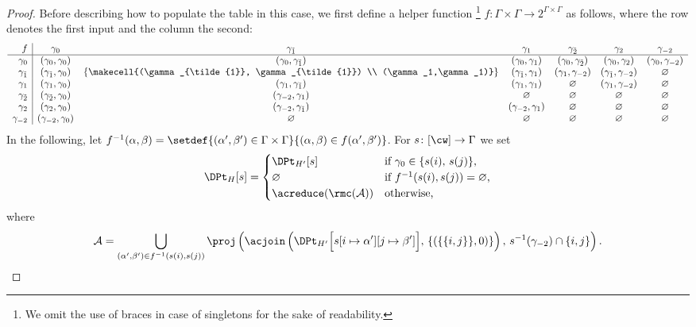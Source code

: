 \begin{proof}
    Before describing how to populate the table in this case,
    we first define a helper function%
    \footnote{We omit the use of braces in case of singletons for the sake of readability.}
    $f \colon \Gamma \times \Gamma \to 2^{\Gamma \times \Gamma}$
    as follows, where the row denotes the first input and the column the second:
    \[
        \begin{array}{r|cccccc}
            f 	                & \gamma_0 							& \gamma_{\tilde{1}} 																			& \gamma_1 							& \gamma_{\tilde{2}} 				& \gamma_2 							& \gamma_{-2} \\
            \hline
            \gamma_0 			& (\gamma_0, \gamma_0) 				& (\gamma_0, \gamma_{\tilde{1}}) 																& (\gamma_0, \gamma_1) 				& (\gamma_0, \gamma_{\tilde{2}}) 	& (\gamma_0, \gamma_2) 				& (\gamma_0, \gamma_{-2}) \\
            \gamma_{\tilde{1}} 	& (\gamma_{\tilde{1}}, \gamma_0) 	& \left\{\makecell{(\gamma_{\tilde{1}}, \gamma_{\tilde{1}}) \\ (\gamma_1,\gamma_1)} \right\} 	& (\gamma_{\tilde{1}}, \gamma_1) 	& (\gamma_1, \gamma_{-2}) 			& (\gamma_{\tilde{1}}, \gamma_{-2}) & \varnothing \\
            \gamma_1 			& (\gamma_1, \gamma_0) 				& (\gamma_1, \gamma_{\tilde{1}}) 																& (\gamma_1, \gamma_1) 				& \varnothing 								& (\gamma_1, \gamma_{-2}) 	& \varnothing \\
            \gamma_{\tilde{2}} 	& (\gamma_{\tilde{2}}, \gamma_0)	& (\gamma_{-2}, \gamma_1) 																		& \varnothing 						& \varnothing 								& \varnothing 				& \varnothing \\
            \gamma_2 			& (\gamma_2, \gamma_0) 				& (\gamma_{-2}, \gamma_{\tilde{1}}) 															& (\gamma_{-2}, \gamma_1) 			& \varnothing 								& \varnothing 				& \varnothing \\
            \gamma_{-2}			& (\gamma_{-2}, \gamma_0) 			& \varnothing																					& \varnothing 						& \varnothing 								& \varnothing 				& \varnothing
        \end{array}
    \]
    In the following, let $f^{-1}(\alpha, \beta) = \setdef{(\alpha', \beta') \in \Gamma \times \Gamma}{(\alpha,\beta) \in f(\alpha', \beta')}$.
    For $s \colon [\cw] \to \Gamma$ we set
    \[
        \DPt_H[s] =
            \begin{cases}
                \DPt_{H'}[s]		            &\text{if $\gamma_0 \in \{s(i), \, s(j)\}$,}\\
                \varnothing			            &\text{if $f^{-1}(s(i),s(j)) = \varnothing$,}\\
                \acreduce ( \rmc(\mathcal{A}) ) &\text{otherwise,}
            \end{cases}
    \]
    where
    \[
        \mathcal{A} = \bigcup_{(\alpha',\beta') \in f^{-1}(s(i),s(j))}
            \proj \left(
                \acjoin\left( \DPt_{H'} \Bigl[ s[i \mapsto \alpha'][j \mapsto \beta'] \Bigr], \,
                \{ ( \{\{i,j\}\},0)\}\right), \,
                s^{-1}(\gamma_{-2}) \cap \{i,j\}
            \right).
    \]


\end{proof}

